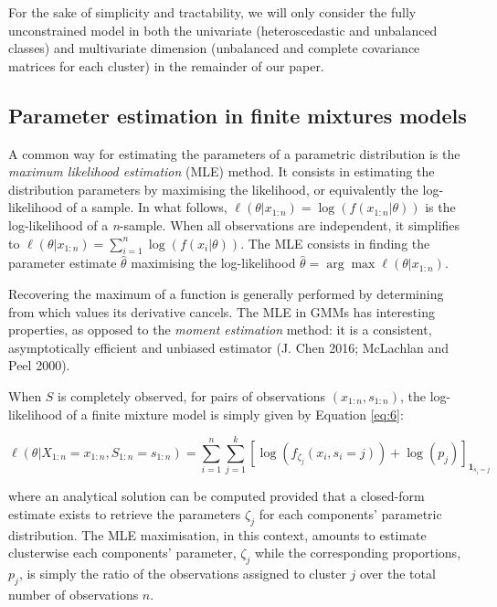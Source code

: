 For the sake of simplicity and tractability, we will only consider the
fully unconstrained model in both the univariate (heteroscedastic and
unbalanced classes) and multivariate dimension (unbalanced and complete
covariance matrices for each cluster) in the remainder of our paper.

\color{black}

\hypertarget{parameter-estimation-in-finite-mixtures-models}{%
\subsection{Parameter estimation in finite mixtures models}\label{parameter-estimation-in-finite-mixtures-models}}

A common way for estimating the parameters of a parametric distribution is
the \emph{maximum likelihood estimation} (MLE) method. It consists in
estimating the distribution parameters by maximising the likelihood, or
equivalently the log-likelihood of a sample. In what follows,
\(\ell(\theta|x_{1:n})=\log (f(x_{1:n}|\theta))\) is the log-likelihood of
a \emph{n}-sample. When all observations are independent, it simplifies to
\(\ell(\theta|x_{1:n}) = \sum_{i=1}^n \log (f(x_i|\theta))\). The MLE
consists in finding the parameter estimate \(\hat{\theta}\) maximising the
log-likelihood \(\hat{\theta} = \arg \max \ell (\theta | x_{1:n})\).

Recovering the maximum of a function is generally performed by
determining from which values its derivative cancels. The MLE in GMMs
has interesting properties, as opposed to the \emph{moment estimation}
method: it is a consistent, asymptotically efficient and unbiased
estimator (J. Chen 2016; McLachlan and Peel 2000).

When \(S\) is completely observed, for pairs of observations
\((x_{1:n}, s_{1:n})\), the log-likelihood of a finite mixture model is
simply given by Equation \eqref{eq:6}:

\begin{equation}
\ell(\theta|X_{1:n}=x_{1:n}, S_{1:n}=s_{1:n})=\sum_{i=1}^n \sum_{j=1}^k \left[\log\left(f_{\zeta_j} (x_i, s_i=j)\right) + \log(p_j) \right]_{\mathbf{1}_{s_i=j}}
\label{eq:6}
\end{equation}

where an analytical solution can be computed provided that a closed-form estimate exists to retrieve the parameters \(\zeta_j\) for each components' parametric distribution. The MLE maximisation, in this context, amounts to estimate clusterwise each components' parameter, \(\zeta_j\) while the corresponding proportions, \(p_j\), is simply the ratio of the observations assigned to cluster \(j\) over the total number of observations \(n\).

